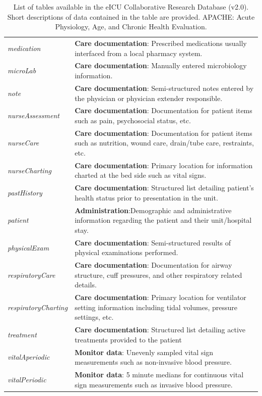 \documentclass[english]{article}
\newcommand{\tblname}[1]{\emph{#1}}
\begin{document}
\begin{center}
\begin{table}
\begin{tabular}{p{4.4cm}|p{10.5cm}}
  \tblname{medication} &  \textbf{Care documentation}: Prescribed medications usually interfaced from a local pharmacy system. \\
  \tblname{microLab}   &  \textbf{Care documentation}: Manually entered microbiology information. \\
  \tblname{note}   &  \textbf{Care documentation}: Semi-structured notes entered by the physician or physician extender responsible. \\
  \tblname{nurseAssessment}   &  \textbf{Care documentation}: Documentation for patient items such as pain, psychosocial status, etc. \\
  \tblname{nurseCare}   &  \textbf{Care documentation}: Documentation for patient items such as nutrition, wound care, drain/tube care, restraints, etc. \\
  \tblname{nurseCharting} &  \textbf{Care documentation}: Primary location for information charted at the bed side such as vital signs. \\
  \tblname{pastHistory} &  \textbf{Care documentation}: Structured list detailing patient's health status prior to presentation in the unit.  \\
  \tblname{patient}  &  \textbf{Administration}:Demographic and administrative information regarding the patient and their unit/hospital stay.  \\
  \tblname{physicalExam}   &  \textbf{Care documentation}: Semi-structured results of physical examinations performed. \\
  \tblname{respiratoryCare}   &  \textbf{Care documentation}: Documentation for airway structure, cuff pressures, and other respiratory related details. \\
  \tblname{respiratoryCharting}   &  \textbf{Care documentation}: Primary location for ventilator setting information including tidal volumes, pressure settings, etc. \\
  \tblname{treatment} & \textbf{Care documentation}: Structured list detailing active treatments provided to the patient  \\
  \tblname{vitalAperiodic} & \textbf{Monitor data}: Unevenly sampled vital sign measurements such as non-invasive blood pressure.  \\
  \tblname{vitalPeriodic} & \textbf{Monitor data}: 5 minute medians for continuous vital sign measurements such as invasive blood pressure.  \\
 \hline
 \end{tabular}
 \caption{List of tables available in the eICU Collaborative Research Database (v2.0). Short descriptions of data contained in the table are provided. APACHE: Acute Physiology, Age, and Chronic Health Evaluation.
 \label{tab:tables_available}}
\end{table}
\end{center}
\end{document}
